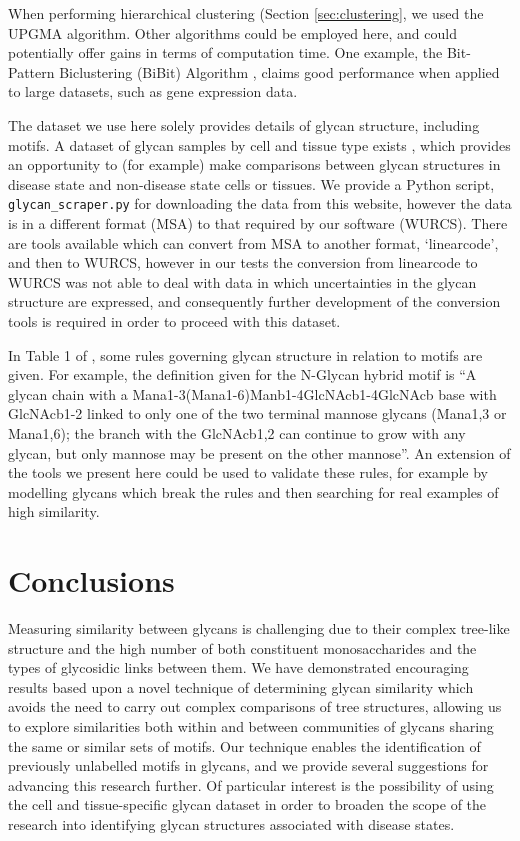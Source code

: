 \documentclass[12pt,a4paper]{article}
\begin{document}
When performing hierarchical clustering (Section \ref{sec:clustering}, we used the UPGMA algorithm. Other algorithms could be employed here, and could potentially offer gains in terms of computation time. One example, the Bit-Pattern Biclustering (BiBit) Algorithm \citep{rodriguez2011biclustering}, claims good performance when applied to large datasets, such as gene expression data. 

The dataset we use here solely provides details of glycan structure, including motifs. A dataset of glycan samples by cell and tissue type exists \citep{cfg_dataset}, which provides an opportunity to (for example) make comparisons between glycan structures in disease state and non-disease state cells or tissues. We provide a Python script, \texttt{glycan\_scraper.py} for downloading the data from this website, however the data is in a different format (MSA) to that required by our software (WURCS). There are tools available \citep{Glycome_Analytics_Platform} which can convert from MSA to another format, `linearcode', and then to WURCS, however in our tests the conversion from linearcode to WURCS was not able to deal with data in which uncertainties in the glycan structure are expressed, and consequently further development of the conversion tools is required in order to proceed with this dataset.

In Table 1 of \citep{porter2009motif}, some rules governing glycan structure in relation to motifs are given. For example, the definition given for the N-Glycan hybrid motif is ``A glycan chain with a Mana1-3(Mana1-6)Manb1-4GlcNAcb1-4GlcNAcb base with GlcNAcb1-2 linked to only one of the two terminal mannose glycans (Mana1,3 or Mana1,6); the branch with the GlcNAcb1,2 can continue to grow with any glycan, but only mannose may be present on the other mannose''. An extension of the tools we present here could be used to validate these rules, for example by modelling glycans which break the rules and then searching for real examples of high similarity.

\newpage
\section{Conclusions}
\label{sec:conclusions}

Measuring similarity between glycans is challenging due to their complex tree-like structure and the high number of both constituent monosaccharides and the types of glycosidic links between them. We have demonstrated encouraging results based upon a novel technique of determining glycan similarity which avoids the need to carry out complex comparisons of tree structures, allowing us to explore similarities both within and between communities of glycans sharing the same or similar sets of motifs. Our technique enables the identification of previously unlabelled motifs in glycans, and we provide several suggestions for advancing this research further. Of particular interest is the possibility of using the cell and tissue-specific glycan dataset in order to broaden the scope of the research into identifying glycan structures associated with disease states.
\end{document}
